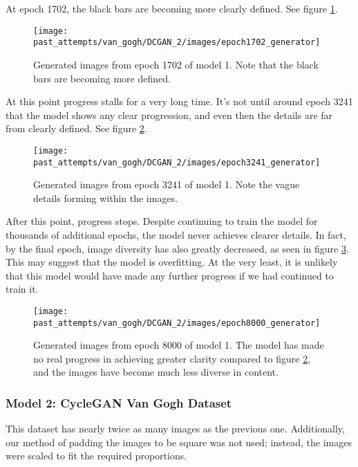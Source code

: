 \documentclass[11pt,letterpaper]{article}
\begin{document}
				At epoch 1702, the black bars are becoming more clearly defined.
				See figure \ref{fig:vgm:epoch1702generator}.
				\begin{figure}
					\centering
					\texttt{[image: past\_attempts/van\_gogh/DCGAN\_2/images/epoch1702\_generator]}
					\caption[Van Gogh Museum dataset, epoch 1702]{Generated images from epoch 1702 of model 1. Note that the black bars are becoming more defined.}
					\label{fig:vgm:epoch1702generator}
				\end{figure}

				At this point progress stalls for a very long time.
				It's not until around epoch 3241 that the model shows any clear progression, and even then the details are far from clearly defined.
				See figure \ref{fig:vgm:epoch3241generator}.
				\begin{figure}
					\centering
					\texttt{[image: past\_attempts/van\_gogh/DCGAN\_2/images/epoch3241\_generator]}
					\caption[Van Gogh Museum dataset, epoch 3241]{Generated images from epoch 3241 of model 1. Note the vague details forming within the images.}
					\label{fig:vgm:epoch3241generator}
				\end{figure}

				After this point, progress stops.
				Despite continuing to train the model for thousands of additional epochs, the model never achieves clearer details.
				In fact, by the final epoch, image diversity has also greatly decreased, as seen in figure \ref{fig:vgm:epoch8000generator}.
				This may suggest that the model is overfitting.
				At the very least, it is unlikely that this model would have made any further progress if we had continued to train it.
				\begin{figure}
					\centering
					\texttt{[image: past\_attempts/van\_gogh/DCGAN\_2/images/epoch8000\_generator]}
					\caption[Van Gogh Museum dataset, epoch 8000]{Generated images from epoch 8000 of model 1. The model has made no real progress in achieving greater clarity compared to figure \ref{fig:vgm:epoch3241generator}, and the images have become much less diverse in content.}
					\label{fig:vgm:epoch8000generator}
				\end{figure}
			\subsubsection{Model 2: CycleGAN Van Gogh Dataset}
				This dataset has nearly twice as many images as the previous one.
				Additionally, our method of padding the images to be square was not used; instead, the images were scaled to fit the required proportions.
\end{document}

